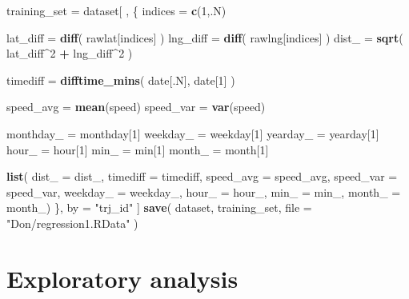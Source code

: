 \documentclass[]{article}
\newenvironment{Shaded}{\begin{snugshade}}{\end{snugshade}}
\newcommand{\DataTypeTok}[1]{\textcolor[rgb]{0.13,0.29,0.53}{#1}}
\newcommand{\DecValTok}[1]{\textcolor[rgb]{0.00,0.00,0.81}{#1}}
\newcommand{\KeywordTok}[1]{\textcolor[rgb]{0.13,0.29,0.53}{\textbf{#1}}}
\newcommand{\NormalTok}[1]{#1}
\newcommand{\OperatorTok}[1]{\textcolor[rgb]{0.81,0.36,0.00}{\textbf{#1}}}
\newcommand{\StringTok}[1]{\textcolor[rgb]{0.31,0.60,0.02}{#1}}
\begin{document}
\begin{Shaded}
\begin{Highlighting}[]
\NormalTok{training_set =}\StringTok{ }\NormalTok{dataset[ , \{}
\NormalTok{    indices =}\StringTok{ }\KeywordTok{c}\NormalTok{(}\DecValTok{1}\NormalTok{,.N)}
    
\NormalTok{    lat_diff =}\StringTok{ }\KeywordTok{diff}\NormalTok{( rawlat[indices] )}
\NormalTok{    lng_diff =}\StringTok{ }\KeywordTok{diff}\NormalTok{( rawlng[indices] )}
\NormalTok{    dist_ =}\StringTok{ }\KeywordTok{sqrt}\NormalTok{( lat_diff}\OperatorTok{^}\DecValTok{2} \OperatorTok{+}\StringTok{ }\NormalTok{lng_diff}\OperatorTok{^}\DecValTok{2}\NormalTok{ )}
    
\NormalTok{    timediff =}\StringTok{ }\KeywordTok{difftime_mins}\NormalTok{( date[.N], date[}\DecValTok{1}\NormalTok{] ) }
    
\NormalTok{    speed_avg =}\StringTok{ }\KeywordTok{mean}\NormalTok{(speed)}
\NormalTok{    speed_var =}\StringTok{ }\KeywordTok{var}\NormalTok{(speed)}
    
\NormalTok{    monthday_ =}\StringTok{ }\NormalTok{monthday[}\DecValTok{1}\NormalTok{]}
\NormalTok{    weekday_ =}\StringTok{ }\NormalTok{weekday[}\DecValTok{1}\NormalTok{]}
\NormalTok{    yearday_ =}\StringTok{ }\NormalTok{yearday[}\DecValTok{1}\NormalTok{]}
\NormalTok{    hour_ =}\StringTok{ }\NormalTok{hour[}\DecValTok{1}\NormalTok{]}
\NormalTok{    min_ =}\StringTok{ }\NormalTok{min[}\DecValTok{1}\NormalTok{]}
\NormalTok{    month_ =}\StringTok{ }\NormalTok{month[}\DecValTok{1}\NormalTok{]}
    
    \KeywordTok{list}\NormalTok{( }\DataTypeTok{dist_ =}\NormalTok{ dist_, }\DataTypeTok{timediff =}\NormalTok{ timediff, }\DataTypeTok{speed_avg =}\NormalTok{ speed_avg,}
        \DataTypeTok{speed_var =}\NormalTok{ speed_var, }\DataTypeTok{weekday_ =}\NormalTok{ weekday_,}
        \DataTypeTok{hour_ =}\NormalTok{ hour_, }\DataTypeTok{min_ =}\NormalTok{ min_, }\DataTypeTok{month_ =}\NormalTok{ month_)}
\NormalTok{\}, by =}\StringTok{ "trj_id"}\NormalTok{ ]}
\KeywordTok{save}\NormalTok{( dataset, training_set, }\DataTypeTok{file =} \StringTok{"Don/regression1.RData"}\NormalTok{ )}
\end{Highlighting}
\end{Shaded}

\hypertarget{exploratory-analysis}{%
\section{Exploratory analysis}\label{exploratory-analysis}}
\end{document}
